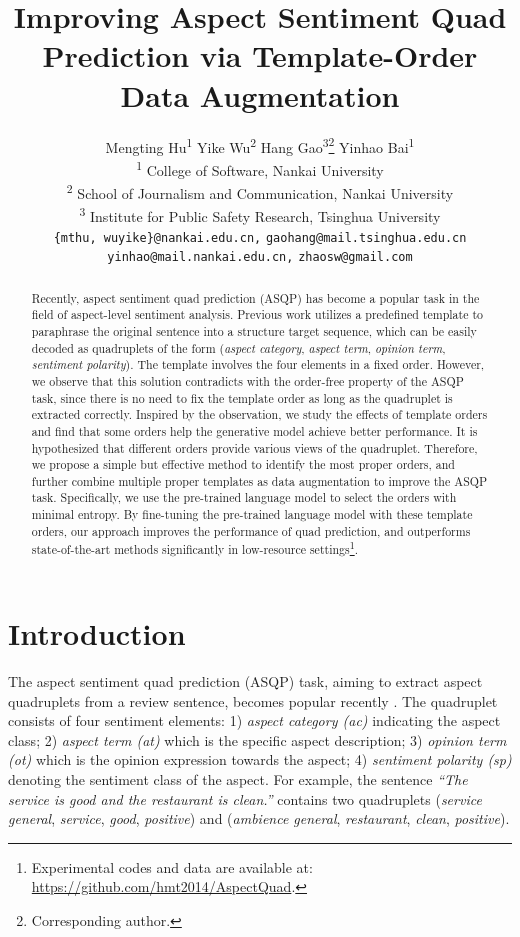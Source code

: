\documentclass[11pt]{article}
\title{Improving Aspect Sentiment Quad Prediction via Template-Order \\ Data Augmentation}
\author{Mengting Hu\textsuperscript{1} \quad Yike Wu\textsuperscript{2} \quad Hang Gao\textsuperscript{3}\thanks{\; Corresponding author.} \quad Yinhao Bai\textsuperscript{1} \quad {\bf Shiwan Zhao\textsuperscript{}\thanks{\; Independent researcher.}} \\
\textsuperscript{1} College of Software, Nankai University \\
\textsuperscript{2} School of Journalism and Communication, Nankai University \\
\textsuperscript{3} Institute for Public Safety Research, Tsinghua University \\
{\tt \{mthu, wuyike\}@nankai.edu.cn,} {\tt gaohang@mail.tsinghua.edu.cn} \\ {\tt yinhao@mail.nankai.edu.cn,} 
{\tt zhaosw@gmail.com}
}
\begin{document}
\maketitle
\begin{abstract}




Recently, aspect sentiment quad prediction (ASQP) has become a popular task in the field of aspect-level sentiment analysis. Previous work utilizes a predefined template to paraphrase the original sentence into a structure target sequence, which can be easily decoded as quadruplets of the form (\emph{aspect category}, \emph{aspect term}, \emph{opinion term}, \emph{sentiment polarity}). The template involves the four elements in a fixed order. However, we observe that this solution contradicts with the order-free property of the ASQP task, since there is no need to fix the template order as long as the quadruplet is extracted correctly. Inspired by the observation, we study the effects of template orders and find that some orders help the generative model achieve better performance. It is hypothesized that different orders provide various views of the quadruplet. Therefore, we propose a simple but effective method to identify the most proper orders, and further combine multiple proper templates as data augmentation to improve the ASQP task. Specifically, we use the pre-trained language model to select the orders with minimal entropy. By fine-tuning the pre-trained language model with these template orders, our approach improves the performance of quad prediction, and outperforms state-of-the-art methods significantly in low-resource settings\footnote{Experimental codes and data are available at: \url{https://github.com/hmt2014/AspectQuad}.}.
\end{abstract}



\section{Introduction}
The aspect sentiment quad prediction (ASQP) task, aiming to extract aspect quadruplets from a review sentence, becomes popular recently \cite{zhang-etal-2021-aspect-sentiment,cai2021aspect}. The quadruplet consists of four sentiment elements: 1) \emph{aspect category (ac)} indicating the aspect class; 2) \emph{aspect term (at)} which is the specific aspect description; 3) \emph{opinion term (ot)} which is the opinion expression towards the aspect; 4) \emph{sentiment polarity (sp)} denoting the sentiment class of the aspect. For example, the sentence \emph{``The service is good and the restaurant is clean.''} contains two quadruplets (\emph{service general}, \emph{service}, \emph{good}, \emph{positive}) and (\emph{ambience general}, \emph{restaurant}, \emph{clean}, \emph{positive}).
\end{document}
